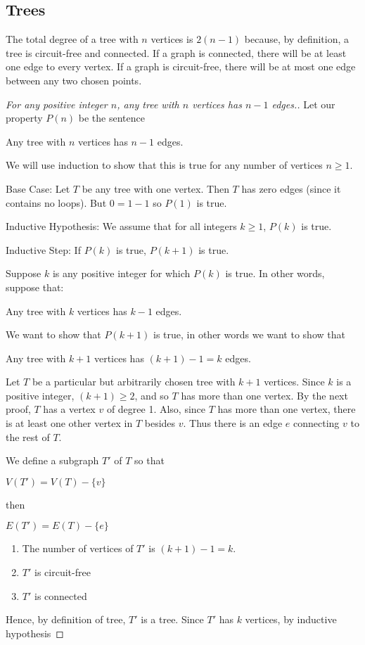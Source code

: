 \documentclass[12pt]{article}
\newenvironment{modenumerate}
  {\enumerate\setupmodenumerate}
  {\endenumerate}
\newif\ifmoditem
\newcommand{\setupmodenumerate}{%
  \global\moditemfalse
  \let\origmakelabel\makelabel
  \def\moditem##1{\global\moditemtrue\def\mesymbol{##1}\item}%
  \def\makelabel##1{%
    \origmakelabel{##1\ifmoditem\rlap{\mesymbol}\fi\enspace}%
    \global\moditemfalse}%
}
\begin{document}
\subsection{Trees}
\begin{modenumerate}
\setcounter{enumi}{2}
\item %
  The total degree of a tree with $n$ vertices is $2(n-1)$ because, by definition, a tree is circuit-free and
  connected. If a graph is connected, there will be at least one edge to every vertex. If a graph is
  circuit-free, there will be at most one edge between any two chosen points.
  \begin{proof}[For any positive integer $n$, any tree with $n$ vertices has $n-1$ edges.]
    Let our property $P(n)$ be the sentence

    Any tree with $n$ vertices has $n-1$ edges.

    We will use induction to show that this is true for any number of vertices $n\geq 1$.
    
    Base Case: Let $T$ be any tree with one vertex. Then $T$ has zero edges (since it contains no loops). But
    $0 = 1-1$ so $P(1)$ is true.

    Inductive Hypothesis: We assume that for all integers $k \geq 1$, $P(k)$ is true.

    Inductive Step: If $P(k)$ is true, $P(k+1)$ is true.

    Suppose $k$ is any positive integer for which $P(k)$ is true. In other words, suppose that:

    Any tree with $k$ vertices has $k -1$ edges.

    We want to show that $P(k+1)$ is true, in other words we want to show that 

    Any tree with $k+1$ vertices has $(k+1)-1 = k$ edges.

    Let $T$ be a particular but arbitrarily chosen tree with $k + 1$ vertices. Since $k$ is a positive
    integer, $(k+1) \geq 2$, and so $T$ has more than one vertex. By the next proof, $T$ has a vertex $v$ of
    degree 1. Also, since $T$ has more than one vertex, there is at least one other vertex in $T$ besides
    $v$. Thus there is an edge $e$ connecting $v$ to the rest of $T$. 

    We define a subgraph $T'$ of $T$ so that 

    $V(T') = V(T) - \{v\}$

    then

    $E(T') = E(T) - \{e\}$
    \begin{enumerate}
    \item The number of vertices of $T'$ is $(k+1)-1=k$.
    \item $T'$ is circuit-free
    \item $T'$ is connected
    \end{enumerate}
    Hence, by definition of tree, $T'$ is a tree. Since $T'$ has $k$ vertices, by inductive hypothesis


\end{proof}
\end{modenumerate}
\end{document}
